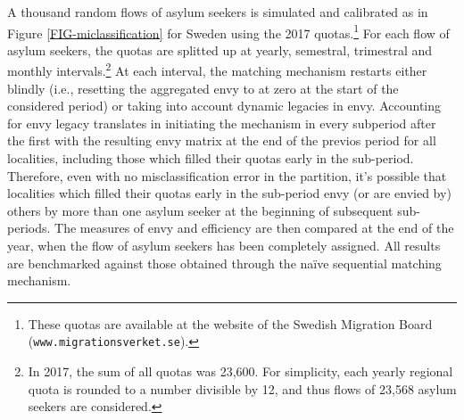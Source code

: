 \documentclass[12pt,fleqn]{article}
\begin{document}
A thousand random flows of asylum seekers is simulated and calibrated as in Figure \ref{FIG-miclassification} for Sweden using the 2017 quotas.\footnote{These quotas are available at the website of the Swedish Migration Board (\texttt{www.migrationsverket.se}).} For each flow of asylum seekers, the quotas are splitted up at yearly, semestral, trimestral and monthly intervals.\footnote{In 2017, the sum of all quotas was 23,600. For simplicity, each yearly regional quota is rounded to a number divisible by 12, and thus flows of 23,568 asylum seekers are considered.} At each interval, the matching mechanism restarts either blindly (i.e., resetting the aggregated envy to at zero at the start of the considered period) or taking into account dynamic legacies in envy. Accounting for envy legacy translates in initiating the mechanism in every subperiod after the first with the resulting envy matrix at the end of the previos period for all localities, including those which filled their quotas early in the sub-period. Therefore, even with no misclassification error in the partition, it's possible that localities which filled their quotas early in the sub-period envy (or are envied by) others by more than one asylum seeker at the beginning of subsequent sub-periods. The measures of envy and efficiency are then compared at the end of the year, when the flow of asylum seekers has been completely assigned. All results are benchmarked against those obtained through the na\"{i}ve sequential matching mechanism.
\end{document}
